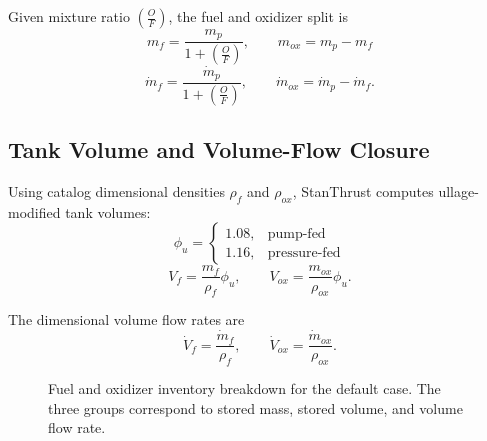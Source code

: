 \documentclass[11pt]{article}
\newcommand{\mdotp}{\dot{m}_{p}}
\newcommand{\mdotf}{\dot{m}_{f}}
\newcommand{\mdoto}{\dot{m}_{ox}}
\newcommand{\OF}{\left(\frac{O}{F}\right)}
\begin{document}
Given mixture ratio $\OF$, the fuel and oxidizer split is
\begin{equation}
m_f=\frac{m_p}{1+\OF},
\qquad
m_{ox}=m_p-m_f
\label{eq:mass-split}
\end{equation}
\begin{equation}
\mdotf=\frac{\mdotp}{1+\OF},
\qquad
\mdoto=\mdotp-\mdotf.
\label{eq:mdot-split}
\end{equation}

\subsection{Tank Volume and Volume-Flow Closure}
Using catalog dimensional densities $\rho_f$ and $\rho_{ox}$, StanThrust computes ullage-modified tank volumes:
\begin{equation}
\phi_u=
\begin{cases}
1.08, & \text{pump-fed}\\
1.16, & \text{pressure-fed}
\end{cases}
\label{eq:ullage}
\end{equation}
\begin{equation}
V_f=\frac{m_f}{\rho_f}\phi_u,
\qquad
V_{ox}=\frac{m_{ox}}{\rho_{ox}}\phi_u.
\label{eq:volumes}
\end{equation}

The dimensional volume flow rates are
\begin{equation}
\dot{V}_f=\frac{\mdotf}{\rho_f},
\qquad
\dot{V}_{ox}=\frac{\mdoto}{\rho_{ox}}.
\label{eq:volume-flows}
\end{equation}

\begin{figure}[H]
\centering
{}
\caption{Fuel and oxidizer inventory breakdown for the default case. The three groups correspond to stored mass, stored volume, and volume flow rate.}
\end{figure}
\end{document}
